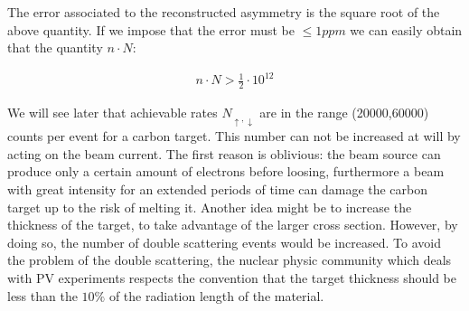 The error associated to the reconstructed asymmetry is the square root of the above quantity. If we impose that the error must be $\le 1ppm$ we can easily obtain that the quantity $n\cdot N$:

\begin{align*}
n\cdot N > \frac{1}{2} \cdot 10^{12}
\end{align*} 

We will see later that achievable rates $N_{\uparrow,\downarrow}$ are in the range (20000,60000) counts per event for a carbon target. This number can not be increased at will by acting on the beam current. The first reason is oblivious: the beam source can produce only a certain amount of electrons before loosing, furthermore a beam with great intensity for an extended periods of time can damage the carbon target up to the risk of melting it. Another idea might be to increase the thickness of the target, to take advantage of the larger cross section. However, by doing so, the number of double scattering events would be increased. To avoid the problem of the double scattering, the nuclear physic community which deals with PV experiments respects the convention that the target thickness should be less than the $10 \%$ of the radiation length of the material.
